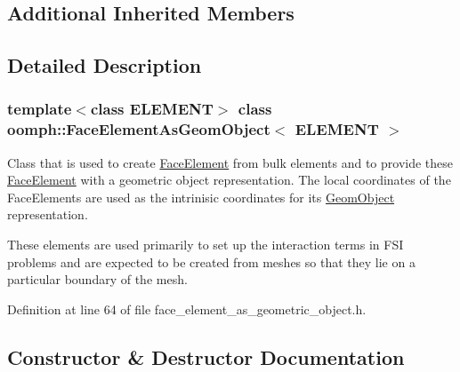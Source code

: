 \subsection*{Additional Inherited Members}


\subsection{Detailed Description}
\subsubsection*{template$<$class E\+L\+E\+M\+E\+NT$>$\newline
class oomph\+::\+Face\+Element\+As\+Geom\+Object$<$ E\+L\+E\+M\+E\+N\+T $>$}

Class that is used to create \hyperlink{classoomph_1_1FaceElement}{Face\+Element} from bulk elements and to provide these \hyperlink{classoomph_1_1FaceElement}{Face\+Element} with a geometric object representation. The local coordinates of the Face\+Elements are used as the intrinisic coordinates for its \hyperlink{classoomph_1_1GeomObject}{Geom\+Object} representation.

These elements are used primarily to set up the interaction terms in F\+SI problems and are expected to be created from meshes so that they lie on a particular boundary of the mesh. 

Definition at line 64 of file face\+\_\+element\+\_\+as\+\_\+geometric\+\_\+object.\+h.



\subsection{Constructor \& Destructor Documentation}
\mbox{\label{classoomph_1_1FaceElementAsGeomObject_ab93ac80cc645460ee51ba86823a883fe}} 
